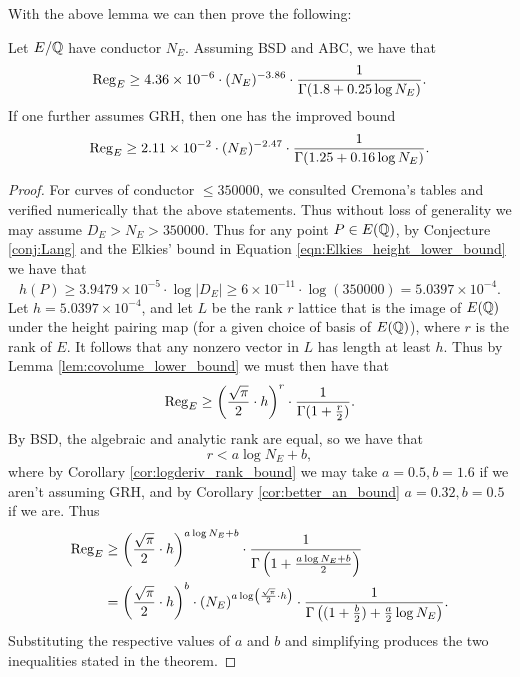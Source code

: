With the above lemma we can then prove the following:
\begin{theorem}\label{thm:regulator_lower_bound}
Let $E/\mathbb{Q}$ have conductor $N_E$. Assuming BSD and ABC, we have that
\begin{equation}
\operatorname{Reg}_E \ge 4.36 \times 10^{-6} \cdot (N_E)^{-3.86} \cdot \frac{1}{\Gamma(1.8+0.25 \log N_E)}.
\end{equation}
If one further assumes GRH, then one has the improved bound
\begin{equation}
\operatorname{Reg}_E \ge 2.11 \times 10^{-2} \cdot (N_E)^{-2.47} \cdot \frac{1}{\Gamma(1.25+0.16 \log N_E)}.
\end{equation}
\end{theorem}
\begin{proof}
For curves of conductor $\le 350000$, we consulted Cremona's tables and verified numerically that the above statements. Thus without loss of generality we may assume $D_E > N_E > 350000$. Thus for any point $P \in E(\mathbb{Q})$, by Conjecture \ref{conj:Lang} and the Elkies' bound in Equation \ref{eqn:Elkies_height_lower_bound} we have that
\begin{equation}
\hat{h}(P) \ge 3.9479\times 10^{-5} \cdot \log |D_E| \ge 6\times10^{-11} \cdot \log(350000) = 5.0397 \times 10^{-4}.
\end{equation}
Let $h = 5.0397 \times 10^{-4}$, and let $L$ be the rank $r$ lattice that is the image of $E(\mathbb{Q})$ under the height pairing map (for a given choice of basis of $E(\mathbb{Q})$), where $r$ is the rank of $E$. It follows that any nonzero vector in $L$ has length at least $h$. Thus by Lemma \ref{lem:covolume_lower_bound} we must then have that
\begin{equation*}
\operatorname{Reg}_E \ge \left(\frac{\sqrt{\pi}}{2}\cdot h\right)^{r} \cdot \frac{1}{\Gamma(1+\frac{r}{2})}.
\end{equation*}
By BSD, the algebraic and analytic rank are equal, so we have that
\begin{equation}
r < a\log N_E + b,
\end{equation}
where by Corollary \ref{cor:logderiv_rank_bound} we may take $a=0.5, b=1.6$ if we aren't assuming GRH, and by Corollary \ref{cor:better_an_bound} $a=0.32, b=0.5$ if we are. Thus
\begin{align*}
\operatorname{Reg}_E &\ge \left(\frac{\sqrt{\pi}}{2}\cdot h\right)^{a \log N_E + b} \cdot \frac{1}{\Gamma\left(1+\frac{a \log N_E + b}{2}\right)} \\
&= \left(\frac{\sqrt{\pi}}{2}\cdot h\right)^{b} \cdot \left(N_E\right)^{a\log \left(\frac{\sqrt{\pi}}{2}\cdot h\right)} \cdot \frac{1}{\Gamma\left((1+\frac{b}{2})+\frac{a}{2} \log N_E \right)}.
\end{align*}
Substituting the respective values of $a$ and $b$ and simplifying produces the two inequalities stated in the theorem.
\end{proof}
